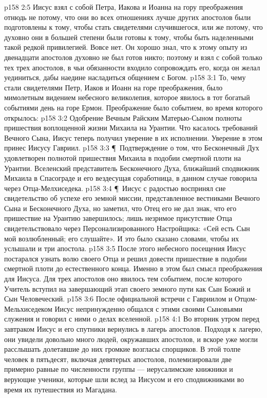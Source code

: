 \vs p158 2:5 Иисус взял с собой Петра, Иакова и Иоанна на гору преображения отнюдь не потому, что они во всех отношениях лучше других апостолов были подготовлены к тому, чтобы стать свидетелями случившегося, или же потому, что духовно они в большей степени были готовы к тому, чтобы быть наделенными такой редкой привилегией. Вовсе нет. Он хорошо знал, что к этому опыту из двенадцати апостолов духовно не был готов никто; поэтому и взял с собой только тех трех апостолов, в чьи обязанности входило сопровождать его, когда он желал уединиться, дабы наедине насладиться общением с Богом.
\vs p158 3:1 То, чему стали свидетелями Петр, Иаков и Иоанн на горе преображения, было мимолетным видением небесного великолепия, которое явилось в тот богатый событиями день на горе Ермон. Преображение было событием, во время которого открылось:
\vs p158 3:2 \bibnobreakspace Одобрение Вечным Райским Матерью\hyp{}Сыном полноты пришествия воплощенной жизни Михаила на Урантии. Что касалось требований Вечного Сына, Иисус теперь получил уверение в их исполнении. Уверение в этом принес Иисусу Гавриил.
\vs p158 3:3 \P\ \bibnobreakspace Подтверждение о том, что Бесконечный Дух удовлетворен полнотой пришествия Михаила в подобии смертной плоти на Урантии. Вселенский представитель Бесконечного Духа, ближайший сподвижник Михаила в Спасограде и его вездесущая соработница, в данном случае говорила через Отца\hyp{}Мелхиседека.
\vs p158 3:4 \P\ Иисус с радостью воспринял сие свидетельство об успехе его земной миссии, представленное вестниками Вечного Сына и Бесконечного Духа, но заметил, что Отец его не дал знак, что его пришествие на Урантию завершилось; лишь незримое присутствие Отца свидетельствовало через Персонализированного Настройщика: «Сей есть Сын мой возлюбленный; его слушайте». И это было сказано словами, чтобы их услышали и три апостола.
\vs p158 3:5 После этого небесного посещения Иисус постарался узнать волю своего Отца и решил довести пришествие в подобии смертной плоти до естественного конца. Именно в этом был смысл преображения для Иисуса. Для трех апостолов оно явилось тем событием, после которого Учитель вступил на завершающий этап своего земного пути как Сын Божий и Сын Человеческий.
\vs p158 3:6 После официальной встречи с Гавриилом и Отцом\hyp{}Мельхиседеком Иисус непринужденно общался с этими своими Сыновьями служения и говорил с ними о делах вселенной.
\vs p158 4:1 Во вторник утром перед завтраком Иисус и его спутники вернулись в лагерь апостолов. Подходя к лагерю, они увидели довольно много людей, окружавших апостолов, и вскоре уже могли расслышать долетавшие до них громкие возгласы спорщиков. В этой толпе человек в пятьдесят, включая девятерых апостолов, полемизировали две примерно равные по численности группы --- иерусалимские книжники и верующие ученики, которые шли вслед за Иисусом и его сподвижниками во время их путешествия из Магадана.
